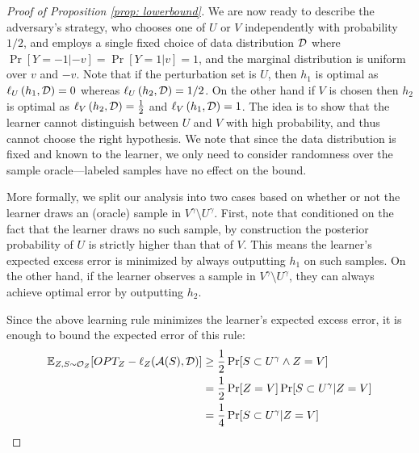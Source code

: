 \begin{proof}[Proof of Proposition \ref{prop: lowerbound}]
We are now ready to describe the adversary's strategy, who chooses one of $U$ or $V$ independently with probability $1/2$, and employs a single fixed choice of data distribution $\mathcal D$ where $\Pr[Y = -1 | -v] = \Pr[Y = 1 | v] = 1$, and the marginal distribution is uniform over $v$ and $-v$. Note that if the perturbation set is $U$, then $h_1$ is optimal as $\ell_U \left( {h_1,\mathcal D} \right)  = 0$ whereas $\ell_U \left( {h_2,\mathcal D} \right)  = 1/2$. On the other hand if $V$ is chosen then $h_2$ is optimal as $\ell_V \left( {h_2,\mathcal D} \right)  = \frac{1}{2}$ and $\ell_V \left( {h_1,\mathcal D} \right)  = 1$. The idea is to show that the learner cannot distinguish between $U$ and $V$ with high probability, and thus cannot choose the right hypothesis. We note that since the data distribution is fixed and known to the learner, we only need to consider randomness over the sample oracle---labeled samples have no effect on the bound.

More formally, we split our analysis into two cases based on whether or not the learner draws an (oracle) sample in $V^\gamma \setminus U^\gamma$. First, note that conditioned on the fact that the learner draws no such sample, by construction the posterior probability of $U$ is strictly higher than that of $V$. This means the learner's expected excess error is minimized by always outputting $h_1$ on such samples. On the other hand, if the learner observes a sample in $V^\gamma \setminus U^\gamma$, they can always achieve optimal error by outputting $h_2$. 

Since the above learning rule minimizes the learner's expected excess error, it is enough to bound the expected error of this rule:
\begin{align*}
    \mathbb{E}_{Z,S \sim \mathcal{O}_Z}[OPT_Z - \ell_{Z}(\mathcal{A}(S),\mathcal D)] &\geq \frac{1}{2}\Pr[S \subset U^\gamma \wedge Z=V]\\
    &= \frac{1}{2}\Pr[Z=V]\Pr[S \subset U^\gamma | Z=V]\\
    &= \frac{1}{4}\Pr[S \subset U^\gamma | Z=V]
\end{align*}


\end{proof}
